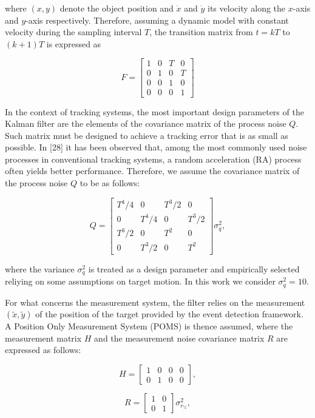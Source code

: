 \documentclass[conference]{IEEEtran}
\begin{document}
where $(x, y)$ denote the object position and $\dot{x}$ and $\dot{y}$ its velocity along the $x$-axis and $y$-axis respectively. Therefore, assuming a dynamic model with constant velocity during the sampling interval $T$, the transition matrix from $t=k T$ to $(k+1) T$ is expressed as

\[
F=\left[\begin{array}{cccc}
1 & 0 & T & 0  \tag{26}\\
0 & 1 & 0 & T \\
0 & 0 & 1 & 0 \\
0 & 0 & 0 & 1
\end{array}\right]
\]

In the context of tracking systems, the most important design parameters of the Kalman filter are the elements of the covariance matrix of the process noise $Q$. Such matrix must be designed to achieve a tracking error that is as small as possible. In [28] it has been observed that, among the most commonly used noise processes in conventional tracking systems, a random acceleration (RA) process often yields better performance. Therefore, we assume the covariance matrix of the process noise $Q$ to be as follows:

\[
Q=\left[\begin{array}{cccc}
T^{4} / 4 & 0 & T^{3} / 2 & 0  \tag{27}\\
0 & T^{4} / 4 & 0 & T^{3} / 2 \\
T^{3} / 2 & 0 & T^{2} & 0 \\
0 & T^{3} / 2 & 0 & T^{2}
\end{array}\right] \sigma_{q}^{2},
\]

where the variance $\sigma_{q}^{2}$ is treated as a design parameter and empirically selected reliying on some assumptions on target motion. In this work we consider $\sigma_{q}^{2}=10$.

For what concerns the measurement system, the filter relies on the measurement $(\tilde{x}, \tilde{y})$ of the position of the target provided by the event detection framework. A Position Only Measurement System (POMS) is thence assumed, where the measurement matrix $H$ and the measurement noise covariance matrix $R$ are expressed as follows:

\[
H=\left[\begin{array}{llll}
1 & 0 & 0 & 0  \tag{28}\\
0 & 1 & 0 & 0
\end{array}\right],
\]

\[
R=\left[\begin{array}{ll}
1 & 0  \tag{29}\\
0 & 1
\end{array}\right] \sigma_{r_{\%}}^{2},
\]
\end{document}
